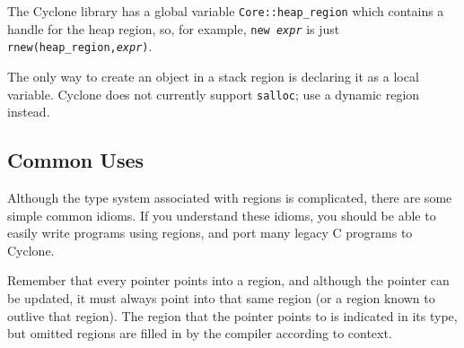 The Cyclone library has a global variable \texttt{Core::heap_region}
which contains a handle for the heap region, so, for example,
\texttt{new {\it expr}} is just \texttt{rnew(heap_region,{\it expr})}.

The only way to create an object in a stack region is declaring it as
a local variable.  Cyclone does not currently support \texttt{salloc};
use a dynamic region instead.

\subsection{Common Uses}

Although the type system associated with regions is complicated, there
are some simple common idioms.  If you understand these idioms, you
should be able to easily write programs using regions, and port many
legacy C programs to Cyclone.

Remember that every pointer points into a region, and although the
pointer can be updated, it must always point into that same region (or
a region known to outlive that region).  The region that the pointer
points to is indicated in its type, but omitted regions are filled in
by the compiler according to context.



